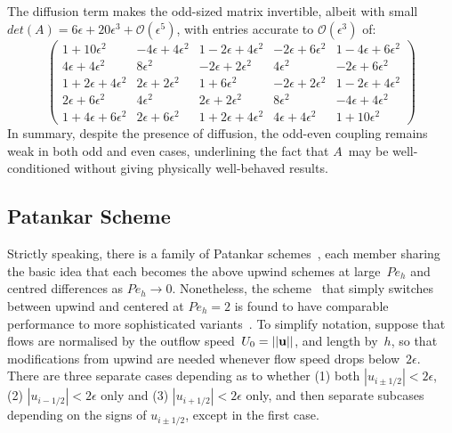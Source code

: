 The diffusion term makes the odd-sized matrix 
invertible, albeit with small $det(A)=6\epsilon+20\epsilon^3+\mathcal{O}(\epsilon^5)$,
with entries accurate to $\mathcal{O}(\epsilon^3)$ of:
\begin{equation}\begin{pmatrix}
1+10 \epsilon^2 & -4 \epsilon+4 \epsilon^2 & 1-2 \epsilon+4 \epsilon^2 & -2 \epsilon+6 \epsilon^2 & 1-4 \epsilon+6 \epsilon^2  \\
4 \epsilon+4 \epsilon^2 & 8 \epsilon^2 & -2 \epsilon+2 \epsilon^2 & 4 \epsilon^2 & -2 \epsilon+6 \epsilon^2  \\
1+2 \epsilon+4 \epsilon^2 & 2 \epsilon+2 \epsilon^2 & 1+6 \epsilon^2 & -2 \epsilon+2 \epsilon^2 & 1-2 \epsilon+4 \epsilon^2  \\
2 \epsilon+6 \epsilon^2 & 4 \epsilon^2 & 2 \epsilon+2 \epsilon^2 & 8 \epsilon^2 & -4 \epsilon+4 \epsilon^2  \\
1+4 \epsilon+6 \epsilon^2 & 2 \epsilon+6 \epsilon^2 & 1+2 \epsilon+4 \epsilon^2 & 4 \epsilon+4 \epsilon^2 & 1+10 \epsilon^2 
\end{pmatrix} \end{equation}
In summary, despite the presence of diffusion, 
the odd-even coupling remains weak in both odd and even cases, underlining the fact that $A$~may
be well-conditioned without giving physically well-behaved results.

\subsection{Patankar Scheme}\label{sec:patankar}
Strictly speaking, there is a family of Patankar schemes~\cite[\S\,5.2]{patankar}, each member sharing the basic idea that each
becomes the above upwind schemes at large~$Pe_h$ and centred differences as 
$Pe_h\rightarrow 0$.  Nonetheless, the scheme~\cite[\S\,5.2-5]{patankar} that simply switches between upwind and
centered at $Pe_h=2$ is found to have comparable performance to more sophisticated 
variants~\cite[\S\,5.2-6]{patankar}. To simplify notation, suppose that flows are normalised by the outflow
speed~$U_0=||{\bf u}||$, and length by~$h$, so that modifications from upwind
are needed whenever flow  speed drops below~$2\epsilon$. 
There are three separate cases depending as to whether (1) both $|u_{i\pm 1/2}|<2\epsilon$,
(2) $|u_{i-1/2}|< 2\epsilon$ only and (3) $|u_{i+1/2}|< 2\epsilon$ only, and then separate subcases
depending on the signs of $u_{i\pm 1/2}$, except in the first case.

